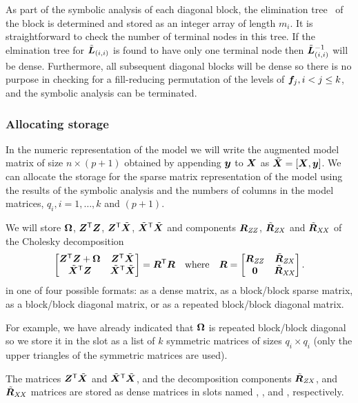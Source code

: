 \documentclass[12pt]{article}
\begin{document}
As part of the symbolic analysis of each diagonal block, the
elimination tree~\citep{Davis:2004} of the block is determined and
stored as an integer array of length $m_i$.  It is straightforward to
check the number of terminal nodes in this tree.  If the elmination
tree for $\tilde{\bm{L}}_{(i,i)}$ is found to have only one terminal node then
$\tilde{\bm{L}}_{(i,i)}^{-1}$ will be dense. Furthermore, all subsequent diagonal
blocks will be dense so there is no purpose in checking for a
fill-reducing permutation of the levels of $\bm{f}_j,i<j\le k$, and the
symbolic analysis can be terminated.

\subsubsection{Allocating storage}

In the numeric representation of the model we will write the augmented
model matrix of size $n\times(p+1)$ obtained by appending $\bm{y}$ to
$\bm{X}$ as $\tilde{\bm{X}}=\left[\bm{X},\bm{y}\right]$.  We can allocate the
storage for the sparse matrix representation of the model using the
results of the symbolic analysis and the numbers of columns in the
model matrices, $q_i,i=1,\dots,k$ and $(p+1)$.

We will store $\bm{\Omega}$, $\bm{Z}^\mathsf{T}\bm{Z}$, $\bm{Z}^\mathsf{T}\tilde{\bm{X}}$,
$\tilde{\bm{X}}^\mathsf{T}\tilde{\bm{X}}$ and components $\bm{R}_\mathit{ZZ}$, $\tilde{\bm{R}}_\mathit{ZX}$ and $\tilde{\bm{R}}_\mathit{XX}$ of
the Cholesky decomposition
\begin{equation}
  \label{eq:tildeCrossProdGen}
  \begin{bmatrix}
    \bm{Z}^\mathsf{T}\bm{Z}+\bm{\Omega} & \bm{Z}^\mathsf{T}\tilde{\bm{X}} \\
    \tilde{\bm{X}}^\mathsf{T}\bm{Z} & \tilde{\bm{X}}^\mathsf{T}\tilde{\bm{X}}
  \end{bmatrix}=\bm{R}^\mathsf{T}\bm{R}\quad\text{where}\quad\bm{R}=
  \begin{bmatrix}
    \bm{R}_\mathit{ZZ} & \tilde{\bm{R}}_\mathit{ZX}\\
    \bm{0}& \tilde{\bm{R}}_\mathit{XX}
  \end{bmatrix} .
\end{equation}
in one of four possible formats: as a dense matrix, as a block/block
sparse matrix, as a block/block diagonal matrix, or as a repeated
block/block diagonal matrix.

For example, we have already indicated that $\bm{\Omega}$ is repeated
block/block diagonal so we store it in the  slot as a list
of $k$ symmetric matrices of sizes $q_i\times q_i$ (only the upper
triangles of the symmetric matrices are used).

The matrices $\bm{Z}^\mathsf{T}\tilde{\bm{X}}$ and
$\tilde{\bm{X}}^\mathsf{T}\tilde{\bm{X}}$, and the decomposition components
$\tilde{\bm{R}}_\mathit{ZX}$, and $\tilde{\bm{R}}_\mathit{XX}$ matrices are stored as dense matrices in slots
named , ,  and , respectively.
\end{document}
